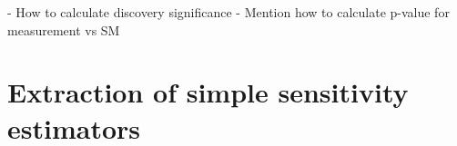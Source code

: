 - How to calculate discovery significance
- Mention how to calculate p-value for measurement vs SM


\section{Extraction of simple sensitivity estimators}

